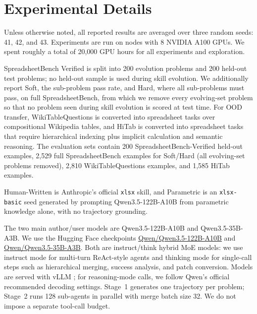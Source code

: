 \section{Experimental Details}
\label{app:experimental_details}

Unless otherwise noted, all reported results are averaged over three random seeds: 41, 42, and 43.
Experiments are run on nodes with 8 NVIDIA A100 GPUs. We spent roughly a total of 20,000 GPU hours for all experiments and exploration.



SpreadsheetBench Verified is split into 200 evolution problems and 200 held-out test problems; no held-out sample is used during skill evolution.
We additionally report Soft, the sub-problem pass rate, and Hard, where all sub-problems must pass, on full SpreadsheetBench, from which we remove every evolving-set problem so that no problem seen during skill evolution is scored at test time.
For OOD transfer, WikiTableQuestions is converted into spreadsheet tasks over compositional Wikipedia tables, and HiTab is converted into spreadsheet tasks that require hierarchical indexing plus implicit calculation and semantic reasoning.
The evaluation sets contain 200 SpreadsheetBench-Verified held-out examples, 2{,}529 full SpreadsheetBench examples for Soft/Hard (all evolving-set problems removed), 2{,}810 WikiTableQuestions examples, and 1{,}585 HiTab examples.

Human-Written is Anthropic's official \texttt{xlsx} skill, and Parametric is an \texttt{xlsx-basic} seed generated by prompting Qwen3.5-122B-A10B from parametric knowledge alone, with no trajectory grounding.

The two main author/user models are Qwen3.5-122B-A10B and Qwen3.5-35B-A3B.
We use the Hugging Face checkpoints \href{https://huggingface.co/Qwen/Qwen3.5-122B-A10B}{Qwen/Qwen3.5-122B-A10B} and \href{https://huggingface.co/Qwen/Qwen3.5-35B-A3B}{Qwen/Qwen3.5-35B-A3B}.
Both are instruct/think hybrid MoE models: we use instruct mode for multi-turn ReAct-style agents and thinking mode for single-call steps such as hierarchical merging, success analysis, and patch conversion.
Models are served with vLLM \citep{kwon2023efficientmemorymanagementlarge}; for reasoning-mode calls, we follow Qwen's official recommended decoding settings.
Stage~1 generates one trajectory per problem; Stage~2 runs 128 sub-agents in parallel with merge batch size 32.
We do not impose a separate tool-call budget.

